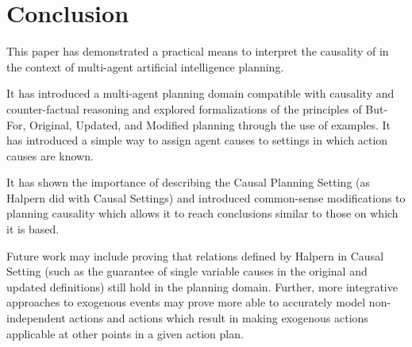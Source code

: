 \documentclass{article}
\theoremstyle{plain}
\theoremstyle{definition}
\begin{document}
\section{Conclusion} \label{conclusion}

This paper has demonstrated a practical means to interpret the causality of \citet{halpern2005causes} in the context of multi-agent artificial intelligence planning.

It has introduced a multi-agent planning domain compatible with causality and counter-factual reasoning and explored formalizations of the principles of But-For, Original, Updated, and Modified planning through the use of examples. It has introduced a simple way to assign agent causes to settings in which action causes are known.

It has shown the importance of describing the Causal Planning Setting (as Halpern did with Causal Settings) and introduced common-sense modifications to planning causality which allows it to reach conclusions similar to those on which it is based.

Future work may include proving that relations defined by Halpern in Causal Setting (such as the guarantee of single variable causes in the original and updated definitions) still hold in the planning domain. Further, more integrative approaches to exogenous events may prove more able to accurately model non-independent actions and actions which result in making exogenous actions applicable at other points in a given action plan.








 
\end{document}
